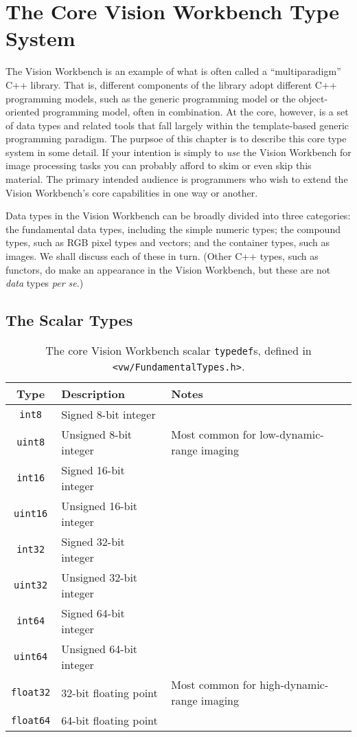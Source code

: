 \chapter{The Core Vision Workbench Type System}

The Vision Workbench is an example of what is often called a
``multiparadigm'' C++ library.  That is, different components of the
library adopt different C++ programming models, such as the generic
programming model or the object-oriented programming model, often in
combination.  At the core, however, is a set of data types and related
tools that fall largely within the template-based generic programming
paradigm.  The purpsoe of this chapter is to describe this core type
system in some detail.  If your intention is simply to {\it use} the
Vision Workbench for image processing tasks you can probably afford
to skim or even skip this material.  The primary intended audience is
programmers who wish to extend the Vision Workbench's core
capabilities in one way or another.

Data types in the Vision Workbench can be broadly divided into three
categories: the fundamental data types, including the simple numeric
types; the compound types, such as RGB pixel types and vectors; and
the container types, such as images.  We shall discuss each of these
in turn.  (Other C++ types, such as functors, do make an appearance in
the Vision Workbench, but these are not {\it data} types {\it per se}.)

\section{The Scalar Types}

\begin{table}[t]\begin{centering}
\begin{tabular}{|c|l|l|} \hline
Type & Description & Notes \\ \hline \hline
\verb#int8# & Signed 8-bit integer & \\ \hline
\verb#uint8# & Unsigned 8-bit integer & Most common for low-dynamic-range imaging \\ \hline
\verb#int16# & Signed 16-bit integer & \\ \hline
\verb#uint16# & Unsigned 16-bit integer & \\ \hline
\verb#int32# & Signed 32-bit integer & \\ \hline
\verb#uint32# & Unsigned 32-bit integer & \\ \hline
\verb#int64# & Signed 64-bit integer & \\ \hline
\verb#uint64# & Unsigned 64-bit integer & \\ \hline
\verb#float32# & 32-bit floating point & Most common for high-dynamic-range imaging \\ \hline
\verb#float64# & 64-bit floating point & \\ \hline
\end{tabular}
\caption{The core Vision Workbench scalar {\tt typedef}s, defined in {\tt <vw/FundamentalTypes.h>}.}
\label{tbl:scalar-types}
\end{centering}\end{table}

